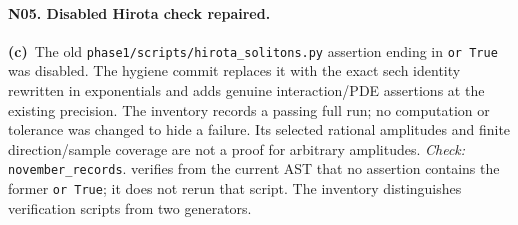 \documentclass[11pt,a4paper]{article}
\newcommand{\C}{\textbf{(c)}\ }
\newcommand{\file}[1]{\nolinkurl{#1}}
\newcommand{\test}[1]{\textit{Check:} \file{#1}.}
\begin{document}
\paragraph{N05. Disabled Hirota check repaired.}
\C The old \file{phase1/scripts/hirota_solitons.py} assertion ending in
\file{or True} was disabled. The hygiene commit replaces it with the exact
sech identity rewritten in exponentials and adds genuine interaction/PDE
assertions at the existing precision. The inventory records a passing full
run; no computation or tolerance was changed to hide a failure. Its selected
rational amplitudes and finite direction/sample coverage are not a proof for
arbitrary amplitudes. \test{november_records} verifies from the current AST
that no assertion contains the former \file{or True}; it does not rerun that
script. The inventory distinguishes verification scripts from two generators.
\end{document}
